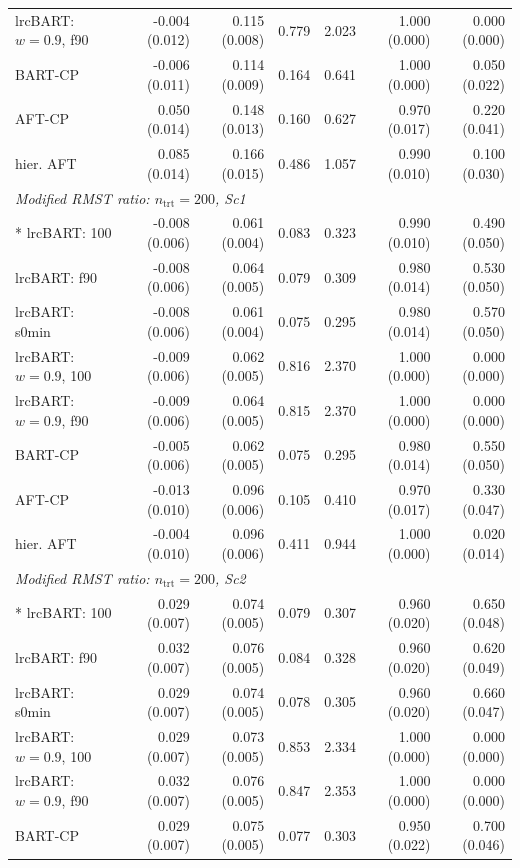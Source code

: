 \begin{landscape}
\begin{longtable}{lrrrrrr}
lrcBART: $w=0.9$, f90 & -0.004 (0.012) & 0.115 (0.008) & 0.779 & 2.023 & 1.000 (0.000) & 0.000 (0.000) \\
BART-CP & -0.006 (0.011) & 0.114 (0.009) & 0.164 & 0.641 & 1.000 (0.000) & 0.050 (0.022) \\
AFT-CP & 0.050 (0.014) & 0.148 (0.013) & 0.160 & 0.627 & 0.970 (0.017) & 0.220 (0.041) \\
hier. AFT & 0.085 (0.014) & 0.166 (0.015) & 0.486 & 1.057 & 0.990 (0.010) & 0.100 (0.030) \\
\multicolumn{7}{l}{\strut\textit{Modified RMST ratio: $n_{\mathrm{trt}}=200$, Sc1}}\\*
lrcBART: 100 & -0.008 (0.006) & 0.061 (0.004) & 0.083 & 0.323 & 0.990 (0.010) & 0.490 (0.050) \\
lrcBART: f90 & -0.008 (0.006) & 0.064 (0.005) & 0.079 & 0.309 & 0.980 (0.014) & 0.530 (0.050) \\
lrcBART: s0min & -0.008 (0.006) & 0.061 (0.004) & 0.075 & 0.295 & 0.980 (0.014) & 0.570 (0.050) \\
lrcBART: $w=0.9$, 100 & -0.009 (0.006) & 0.062 (0.005) & 0.816 & 2.370 & 1.000 (0.000) & 0.000 (0.000) \\
lrcBART: $w=0.9$, f90 & -0.009 (0.006) & 0.064 (0.005) & 0.815 & 2.370 & 1.000 (0.000) & 0.000 (0.000) \\
BART-CP & -0.005 (0.006) & 0.062 (0.005) & 0.075 & 0.295 & 0.980 (0.014) & 0.550 (0.050) \\
AFT-CP & -0.013 (0.010) & 0.096 (0.006) & 0.105 & 0.410 & 0.970 (0.017) & 0.330 (0.047) \\
hier. AFT & -0.004 (0.010) & 0.096 (0.006) & 0.411 & 0.944 & 1.000 (0.000) & 0.020 (0.014) \\
\multicolumn{7}{l}{\strut\textit{Modified RMST ratio: $n_{\mathrm{trt}}=200$, Sc2}}\\*
lrcBART: 100 & 0.029 (0.007) & 0.074 (0.005) & 0.079 & 0.307 & 0.960 (0.020) & 0.650 (0.048) \\
lrcBART: f90 & 0.032 (0.007) & 0.076 (0.005) & 0.084 & 0.328 & 0.960 (0.020) & 0.620 (0.049) \\
lrcBART: s0min & 0.029 (0.007) & 0.074 (0.005) & 0.078 & 0.305 & 0.960 (0.020) & 0.660 (0.047) \\
lrcBART: $w=0.9$, 100 & 0.029 (0.007) & 0.073 (0.005) & 0.853 & 2.334 & 1.000 (0.000) & 0.000 (0.000) \\
lrcBART: $w=0.9$, f90 & 0.032 (0.007) & 0.076 (0.005) & 0.847 & 2.353 & 1.000 (0.000) & 0.000 (0.000) \\
BART-CP & 0.029 (0.007) & 0.075 (0.005) & 0.077 & 0.303 & 0.950 (0.022) & 0.700 (0.046) \\

\end{longtable}
\end{landscape}
